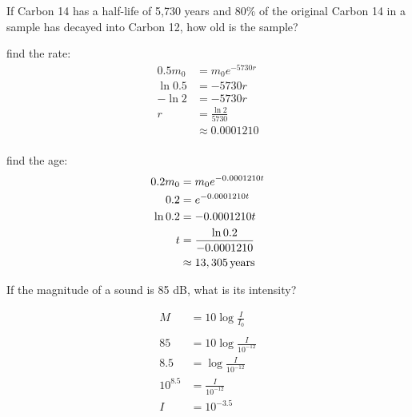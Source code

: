 \documentclass[fleqn,addpoints]{exam}
\begin{document}
\begin{questions}
    \question[10]
      If Carbon 14 has a half-life of 5,730 years and 80\% of the original Carbon 14 in a sample has decayed into Carbon
      12, how old is the sample?

      \begin{solution}
        find the rate:
        \begin{align*}
          0.5 m_0 & = m_0 e^{-5730r} \\
          \ln 0.5 & = -5730r \\
          - \ln 2 & = -5730r \\
          r       & = \frac{\ln 2}{5730} \\
                  & \approx 0.0001210 \\
        \end{align*}

        find the age:
        \begin{align*}
          0.2 m_0 & = m_0 e^{-0.0001210 t} \\
          0.2     & = e^{-0.0001210 t} \\
          \ln 0.2 & = -0.0001210 t \\
          t       & = \frac{\ln 0.2}{-0.0001210} \\
                  & \approx \unit[13,305]{years} \\
        \end{align*}
      \end{solution}

    \question[7]
      If the magnitude of a sound is 85 dB, what is its intensity?  
      

      \begin{solution}
        \begin{align*}
          M        & = 10 \log \frac{I}{I_0} \\
          \\
          85       & = 10 \log \frac{I}{10^{-12}} \\
          8.5      & = \log \frac{I}{10^{-12}} \\
          10^{8.5} & = \frac{I}{10^{-12}} \\
          I        & = 10^{-3.5} \\
        \end{align*}
      \end{solution}


\end{questions}
\end{document}
